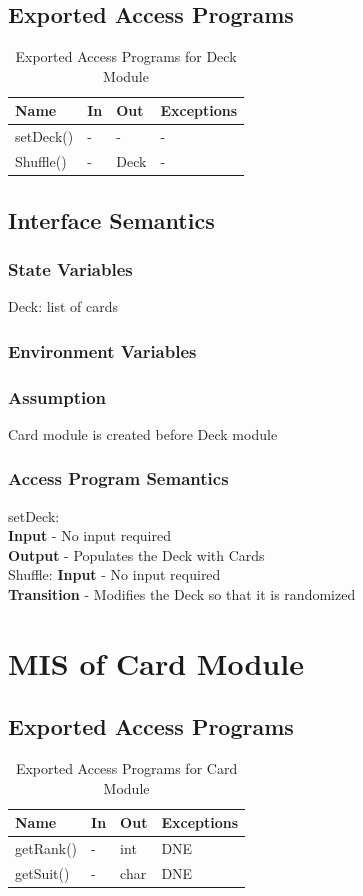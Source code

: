 \documentclass[11pt]{article}
\begin{document}
    \subsection{Exported Access Programs}
    \begin{table}[h]
    \caption{Exported Access Programs for Deck Module}
    \begin{tabular}{p{4cm}p{2cm}p{2cm}p{4cm}}
    Name & In & Out & Exceptions\\
    \hline
    setDeck() & - & - & - \\
    \hline
    Shuffle() & - & Deck & -\\
    \hline
    \end{tabular}
    \end{table}
    \subsection{Interface Semantics}
    \subsubsection{State Variables}
	Deck: list of cards    
    \subsubsection{Environment Variables}
    \subsubsection{Assumption}
    Card module is created before Deck module
    \subsubsection{Access Program Semantics}
    setDeck:\\
    \textbf{Input} - No input required\\
    \textbf{Output} - Populates the Deck with Cards\\  
    Shuffle:
    \textbf{Input} - No input required\\
    \textbf{Transition} - Modifies the Deck so that it is randomized\\
 	\newline
 	\section{MIS of Card Module}
    
    \subsection{Exported Access Programs}
    \begin{table}[h]
    \caption{Exported Access Programs for Card Module}
    \begin{tabular}{p{4cm}p{2cm}p{2cm}p{4cm}}
    Name & In & Out & Exceptions\\
    \hline
    getRank() & - & int & DNE\\
    \hline
    getSuit() & - & char & DNE\\
    \hline
    \end{tabular}
    \end{table}
\end{document}
